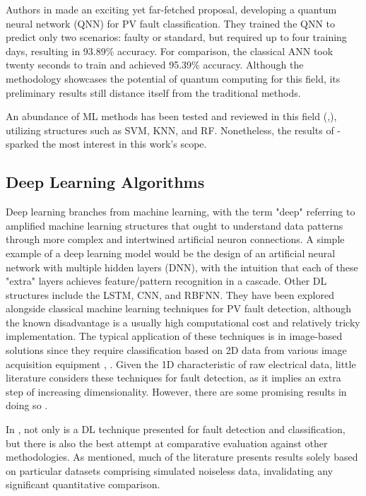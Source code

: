 Authors in \cite{Uehara2021} made an exciting yet far-fetched proposal, developing a quantum neural network (QNN) for PV fault classification. They trained the QNN to predict only two scenarios: faulty or standard, but required up to four training days, resulting in 93.89\% accuracy. For comparison, the classical ANN took twenty seconds to train and achieved 95.39\% accuracy. Although the methodology showcases the potential of quantum computing for this field, its preliminary results still distance itself from the traditional methods.

An abundance of ML methods has been tested and reviewed in this field (\cite{Hong2022},\cite{Livera2019}), utilizing structures such as SVM, KNN, and RF. Nonetheless, the results of \cite{Rao2021}-\cite{Kilic2020} sparked the most interest in this work's scope.

\subsection{Deep Learning Algorithms}

Deep learning branches from machine learning, with the term "deep" referring to amplified machine learning structures that ought to understand data patterns through more complex and intertwined artificial neuron connections. A simple example of a deep learning model would be the design of an artificial neural network with multiple hidden layers (DNN), with the intuition that each of these "extra" layers achieves feature/pattern recognition in a cascade. Other DL structures include the LSTM, CNN, and RBFNN. They have been explored alongside classical machine learning techniques for PV fault detection, although the known disadvantage is a usually high computational cost and relatively tricky implementation. The typical application of these techniques is in image-based solutions \cite{termoreview} since they require classification based on 2D data from various image acquisition equipment \cite{termo}, \cite{dlpv}. Given the 1D characteristic of raw electrical data, little literature considers these techniques for fault detection, as it implies an extra step of increasing dimensionality. However, there are some promising results in doing so \cite{Aziz2020}.

In \cite{Aziz2020}, not only is a DL technique presented for fault detection and classification, but there is also the best attempt at comparative evaluation against other methodologies. As mentioned, much of the literature presents results solely based on particular datasets comprising simulated noiseless data, invalidating any significant quantitative comparison.

